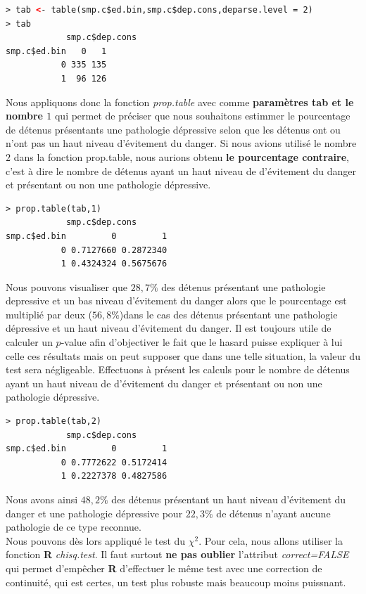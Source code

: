 \begin{lstlisting}[language=html]
> tab <- table(smp.c$ed.bin,smp.c$dep.cons,deparse.level = 2)
> tab
            smp.c$dep.cons
smp.c$ed.bin   0   1
           0 335 135
           1  96 126
\end{lstlisting}
Nous appliquons donc la fonction \textit{prop.table} avec comme \textbf{paramètres tab et le nombre $1$} qui permet de préciser que nous souhaitons estimmer le pourcentage de détenus présentants une pathologie dépressive selon que les détenus ont ou n'ont pas un haut niveau d'évitement du danger.\newline
Si nous avions utilisé le nombre $2$ dans la fonction prop.table, nous aurions obtenu \textbf{le pourcentage contraire}, c'est à dire le nombre de détenus ayant un haut niveau de d'évitement du danger et présentant ou non une pathologie dépressive.
\begin{lstlisting}[language=html]
> prop.table(tab,1)
            smp.c$dep.cons
smp.c$ed.bin         0         1
           0 0.7127660 0.2872340
           1 0.4324324 0.5675676
\end{lstlisting}
Nous pouvons visualiser que $28,7\%$ des détenus présentant une pathologie depressive et un bas niveau d'évitement du danger alors que le pourcentage est multiplié par deux ($56,8\%$)dans le cas des détenus présentant une pathologie dépressive et un haut niveau d'évitement du danger.\newline
Il est toujours utile de calculer un $p$-value afin d'objectiver le fait que le hasard puisse expliquer à lui celle ces résultats mais on peut supposer que dans une telle situation, la valeur du test sera négligeable.\newline
Effectuons à présent les calculs pour le nombre de détenus ayant un haut niveau de d'évitement du danger et présentant ou non une pathologie dépressive.
\begin{lstlisting}[language=html]
> prop.table(tab,2)
            smp.c$dep.cons
smp.c$ed.bin         0         1
           0 0.7772622 0.5172414
           1 0.2227378 0.4827586
\end{lstlisting}
Nous avons ainsi $48,2\%$ des détenus présentant un haut niveau d'évitement du danger et une pathologie dépressive pour $22,3\%$ de détenus n'ayant aucune pathologie de ce type reconnue.\newline
\\
Nous pouvons dès lors appliqué le test du $\chi^{2}$. Pour cela, nous allons utiliser la fonction \textbf{R} \textit{chisq.test}. Il faut surtout \textbf{ne pas oublier} l'attribut \textit{correct=FALSE} qui permet d'empêcher \textbf{R} d'effectuer le même test avec une correction de continuité, qui est certes, un test plus robuste mais beaucoup moins puissnant.
